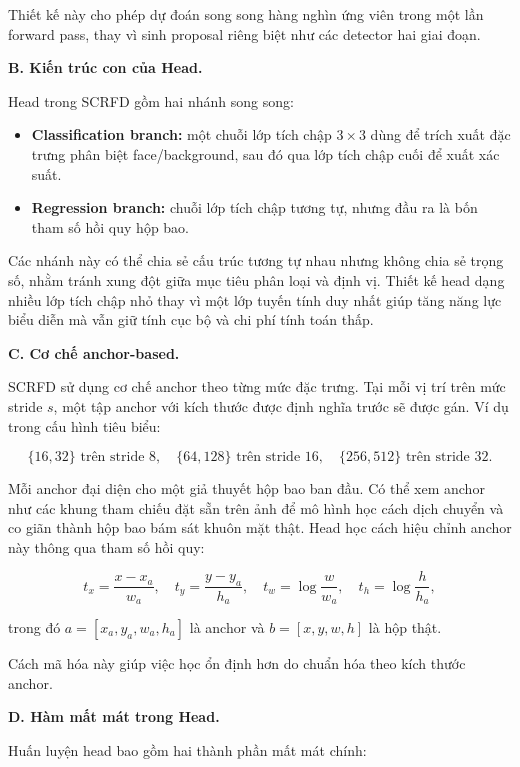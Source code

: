 Thiết kế này cho phép dự đoán song song hàng nghìn ứng viên trong một lần forward pass, thay vì sinh proposal riêng biệt như các detector hai giai đoạn.

\medskip
\noindent\textbf{B. Kiến trúc con của Head.}

Head trong SCRFD gồm hai nhánh song song:

\begin{itemize}
  \item \textbf{Classification branch:} một chuỗi lớp tích chập $3\times3$ dùng để trích xuất đặc trưng phân biệt face/background, sau đó qua lớp tích chập cuối để xuất xác suất.
  \item \textbf{Regression branch:} chuỗi lớp tích chập tương tự, nhưng đầu ra là bốn tham số hồi quy hộp bao.
\end{itemize}

Các nhánh này có thể chia sẻ cấu trúc tương tự nhau nhưng không chia sẻ trọng số, nhằm tránh xung đột giữa mục tiêu phân loại và định vị. 
Thiết kế head dạng nhiều lớp tích chập nhỏ thay vì một lớp tuyến tính duy nhất giúp tăng năng lực biểu diễn mà vẫn giữ tính cục bộ và chi phí tính toán thấp.

\medskip
\noindent\textbf{C. Cơ chế anchor-based.}

SCRFD sử dụng cơ chế anchor theo từng mức đặc trưng. 
Tại mỗi vị trí trên mức stride $s$, một tập anchor với kích thước được định nghĩa trước sẽ được gán. 
Ví dụ trong cấu hình tiêu biểu:

\[
\{16, 32\} \text{ trên stride } 8, \quad
\{64, 128\} \text{ trên stride } 16, \quad
\{256, 512\} \text{ trên stride } 32.
\]

Mỗi anchor đại diện cho một giả thuyết hộp bao ban đầu. 
Có thể xem anchor như các khung tham chiếu đặt sẵn trên ảnh để mô hình học cách dịch chuyển và co giãn thành hộp bao bám sát khuôn mặt thật.
Head học cách hiệu chỉnh anchor này thông qua tham số hồi quy:

\[
t_x = \frac{x - x_a}{w_a}, \quad
t_y = \frac{y - y_a}{h_a}, \quad
t_w = \log\frac{w}{w_a}, \quad
t_h = \log\frac{h}{h_a},
\]

trong đó $a = [x_a, y_a, w_a, h_a]$ là anchor và $b = [x, y, w, h]$ là hộp thật.

Cách mã hóa này giúp việc học ổn định hơn do chuẩn hóa theo kích thước anchor.

\medskip
\noindent\textbf{D. Hàm mất mát trong Head.}

Huấn luyện head bao gồm hai thành phần mất mát chính:


